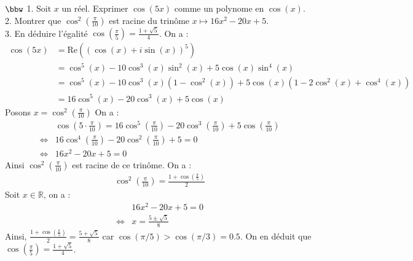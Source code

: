 \documentclass[11pt]{article}
\begin{document}
\begin{exercice}{$\bbw$}{}
    1. Soit $x$ un réel. Exprimer $\cos(5x)$ comme un polynome en $\cos(x)$.\\
    2. Montrer que $\cos^2\left(\frac{\pi}{10}\right)$ est racine du trinôme $x \mapsto 16x^2 - 20x + 5$.\\
    3. En déduire l'égalité $\cos\left(\frac{\pi}{5}\right)=\frac{1+\sqrt{5}}{4}$.
    \tcblower
     On a :
    \begin{align*}
        \cos(5x) &= \text{Re}\left((\cos(x)+i\sin(x))^5\right) \\
        &= \cos^5(x) - 10\cos^3(x)\sin^2(x) + 5\cos(x)\sin^4(x)\\
        &= \cos^5(x) - 10\cos^3(x)(1-\cos^2(x)) + 5\cos(x)(1 - 2\cos^2(x) + \cos^4(x))\\
        &= 16\cos^5(x) - 20\cos^3(x) + 5\cos(x)
    \end{align*}
     Posons $x = \cos^2\left( \frac{\pi}{10} \right)$ On a :
    \begin{align*}
        &\cos\left(5\cdot\frac{\pi}{10}\right)=16\cos^5\left(\frac{\pi}{10}\right)-20\cos^3\left( \frac{\pi}{10} \right) + 5\cos\left( \frac{\pi}{10} \right)\\
        \iff&16\cos^4\left( \frac{\pi}{10} \right) - 20\cos^2 \left( \frac{\pi}{10} \right) + 5 = 0\\
        \iff& 16x^2 - 20x + 5 = 0
    \end{align*}
    Ainsi $\cos^2\left( \frac{\pi}{10} \right)$ est racine de ce trinôme.\n
     On a :
    \begin{align*}
        \cos^2 \left( \frac{\pi}{10} \right) = \frac{1+\cos(\frac{\pi}{5})}{2}
    \end{align*}
    Soit $x\in\mathbb{R}$, on a :
    \begin{align*}
        &16x^2-20x+5=0\\
        \iff& x = \frac{5 \pm \sqrt{5}}{8}
    \end{align*}
    Ainsi, $\frac{1+\cos\left(\frac{\pi}{5}\right)}{2}=\frac{5+\sqrt{5}}{8}$ car $\cos(\pi/5) > \cos(\pi/3) = 0.5$. On en déduit que $\cos\left( \frac{\pi}{5} \right)=\frac{1+\sqrt{5}}{4}$.
\end{exercice}
\end{document}
